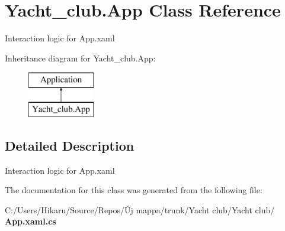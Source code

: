 \section{Yacht\+\_\+club.\+App Class Reference}
\label{class_yacht__club_1_1_app}


Interaction logic for App.\+xaml  


Inheritance diagram for Yacht\+\_\+club.\+App\+:\begin{figure}[H]
\begin{center}
\leavevmode
\includegraphics[height=2.000000cm]{class_yacht__club_1_1_app}
\end{center}
\end{figure}


\subsection{Detailed Description}
Interaction logic for App.\+xaml 



The documentation for this class was generated from the following file\+:\begin{DoxyCompactItemize}
\item 
C\+:/\+Users/\+Hikaru/\+Source/\+Repos/Új mappa/trunk/\+Yacht club/\+Yacht club/\textbf{ App.\+xaml.\+cs}\end{DoxyCompactItemize}
